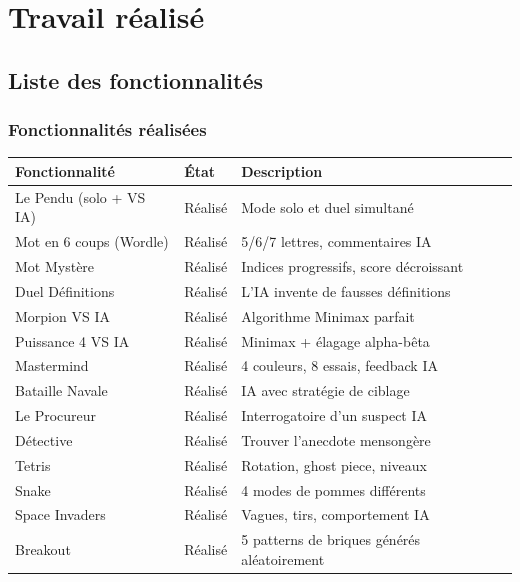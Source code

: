 \documentclass[a4paper, 12pt, twoside]{article}
\newcommand{\cmark}{\ding{51}}
\begin{document}
\newpage

\section{Travail réalisé}

\subsection{Liste des fonctionnalités}

\subsubsection{Fonctionnalités réalisées}

\begin{table}[H]
\centering
\begin{tabular}{|p{6cm}|p{2cm}|p{5cm}|}
\hline
\textbf{Fonctionnalité} & \textbf{État} & \textbf{Description} \\
\hline
Le Pendu (solo + VS IA) & \cmark{} Réalisé & Mode solo et duel simultané \\
\hline
Mot en 6 coups (Wordle) & \cmark{} Réalisé & 5/6/7 lettres, commentaires IA \\
\hline
Mot Mystère & \cmark{} Réalisé & Indices progressifs, score décroissant \\
\hline
Duel Définitions & \cmark{} Réalisé & L'IA invente de fausses définitions \\
\hline
Morpion VS IA & \cmark{} Réalisé & Algorithme Minimax parfait \\
\hline
Puissance 4 VS IA & \cmark{} Réalisé & Minimax + élagage alpha-bêta \\
\hline
Mastermind & \cmark{} Réalisé & 4 couleurs, 8 essais, feedback IA \\
\hline
Bataille Navale & \cmark{} Réalisé & IA avec stratégie de ciblage \\
\hline
Le Procureur & \cmark{} Réalisé & Interrogatoire d'un suspect IA \\
\hline
Détective & \cmark{} Réalisé & Trouver l'anecdote mensongère \\
\hline
Tetris & \cmark{} Réalisé & Rotation, ghost piece, niveaux \\
\hline
Snake & \cmark{} Réalisé & 4 modes de pommes différents \\
\hline
Space Invaders & \cmark{} Réalisé & Vagues, tirs, comportement IA \\
\hline
Breakout & \cmark{} Réalisé & 5 patterns de briques générés aléatoirement \\

\end{tabular}
\end{table}
\end{document}
